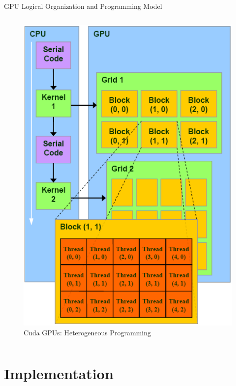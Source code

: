 \documentclass[10pt, red]{beamer}
\begin{document}
\begin{frame}{GPU Logical Organization and Programming Model}
\begin{columns}
\begin{figure}
				\includegraphics[width=\textwidth, height=0.6\textheight]{img/nVidiaExecutionModel}
				\caption{Cuda GPUs: Heterogeneous Programming}
			\end{figure}
		\end{columns}
	\end{frame}


\section{Implementation}
\end{document}
